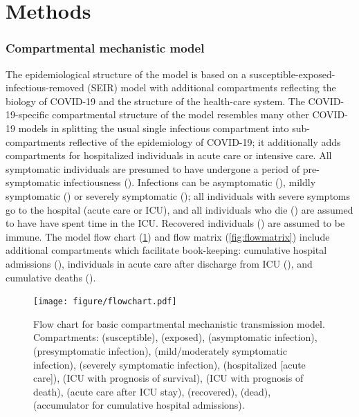 \documentclass[12pt]{article}\usepackage[]{graphicx}\usepackage[]{color}
\begin{document}
\section{Methods}

\subsubsection*{Compartmental mechanistic model}

The epidemiological structure of the model is based on
a susceptible-exposed-infectious-removed (SEIR) model with
additional compartments reflecting the biology of COVID-19 and the
structure of the health-care system. The COVID-19-specific compartmental structure
of the model resembles many other COVID-19 models
in splitting the usual single infectious compartment into sub-compartments reflective
of the epidemiology of COVID-19; it additionally adds
compartments for hospitalized individuals in acute care
or intensive care. All symptomatic individuals are
presumed to have undergone a period of pre-symptomatic infectiousness
(). Infections can be
asymptomatic (), mildly symptomatic () or
severely symptomatic (); all individuals with severe symptoms
go to the hospital (acute care or ICU), and all individuals who die () are assumed to have
have spent time in the ICU.  Recovered individuals () are
assumed to be immune.  The model flow chart
(\cref{fig:flowchart}) and flow matrix (\cref{fig:flowmatrix})
include additional compartments which facilitate book-keeping:
cumulative hospital admissions (), individuals in acute care
after discharge from ICU (), and cumulative deaths
().

\begin{figure}
\color{fgcolor}
\texttt{[image: figure/flowchart.pdf]}
\caption{Flow chart for basic compartmental mechanistic transmission
  model. Compartments:  (susceptible),  (exposed),
   (asymptomatic infection),  (presymptomatic
  infection),  (mild/moderately symptomatic infection),
   (severely symptomatic infection),  (hospitalized
  [acute care]),  (ICU with prognosis of survival),
   (ICU with prognosis of death),  (acute care
  after ICU stay),  (recovered),  (dead), 
  (accumulator for cumulative hospital admissions).
  }
\label{fig:flowchart}
\end{figure}
\end{document}
